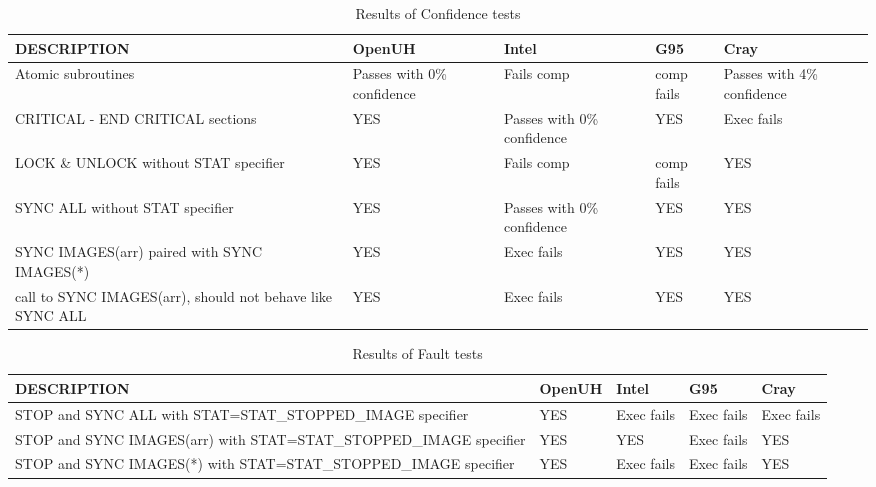 \begin{table}[tbh!]
\small
\caption{Results of Confidence tests}
\label{tab:confidence}
\begin{tabular}{|p{6cm}|p{2cm}|p{2cm}|p{2cm}|p{2cm}|}
\hline
DESCRIPTION  & OpenUH & Intel & G95 & Cray\\\hline
Atomic subroutines & Passes with 0\% confidence & Fails comp & comp fails & Passes with 4\% confidence\\\hline
CRITICAL - END CRITICAL sections & YES & Passes with 0\% confidence & YES& Exec fails\\\hline
LOCK \& UNLOCK without STAT specifier & YES & Fails comp & comp fails & YES\\\hline
SYNC ALL without STAT specifier & YES & Passes with 0\% confidence & YES & YES\\\hline
SYNC IMAGES(arr) paired with SYNC IMAGES(*) & YES & Exec fails& YES & YES\\\hline
call to SYNC IMAGES(arr), should not behave like SYNC ALL & YES & Exec fails & YES & YES\\\hline
\end{tabular}
\end{table}


\begin{table}[tbh!]
\small
\caption{Results of Fault tests}
\label{tab:fault}
\begin{tabular}{|p{6cm}|p{2cm}|p{2cm}|p{2cm}|p{2cm}|}
\hline
DESCRIPTION  & OpenUH & Intel & G95 & Cray\\\hline
STOP and SYNC ALL with STAT=STAT\_STOPPED\_IMAGE specifier & YES & Exec fails & Exec fails & Exec fails\\\hline
STOP and SYNC IMAGES(arr) with STAT=STAT\_STOPPED\_IMAGE specifier & YES & YES & Exec fails & YES\\\hline
STOP and SYNC IMAGES(*) with STAT=STAT\_STOPPED\_IMAGE specifier & YES & Exec fails & Exec fails & YES\\\hline
\end{tabular}
\end{table}

